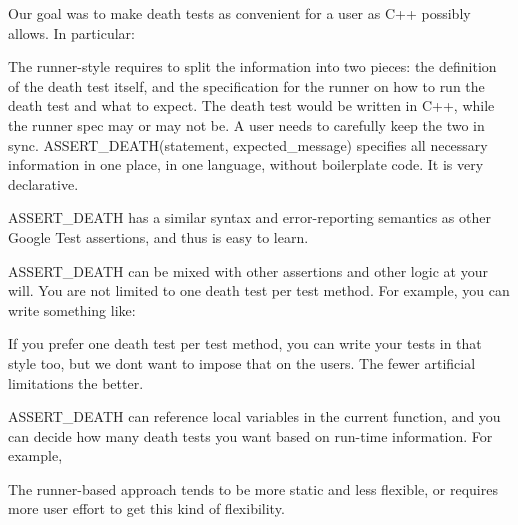 Our goal was to make death tests as convenient for a user as C++ possibly allows. In particular\+:


\begin{DoxyItemize}
\item The runner-\/style requires to split the information into two pieces\+: the definition of the death test itself, and the specification for the runner on how to run the death test and what to expect. The death test would be written in C++, while the runner spec may or may not be. A user needs to carefully keep the two in sync. {\ttfamily A\+S\+S\+E\+R\+T\+\_\+\+D\+E\+A\+T\+H(statement, expected\+\_\+message)} specifies all necessary information in one place, in one language, without boilerplate code. It is very declarative.
\item {\ttfamily A\+S\+S\+E\+R\+T\+\_\+\+D\+E\+A\+TH} has a similar syntax and error-\/reporting semantics as other Google Test assertions, and thus is easy to learn.
\item {\ttfamily A\+S\+S\+E\+R\+T\+\_\+\+D\+E\+A\+TH} can be mixed with other assertions and other logic at your will. You are not limited to one death test per test method. For example, you can write something like\+: 
\begin{DoxyCode}{0}
\DoxyCodeLine{   \}}
\end{DoxyCode}
 If you prefer one death test per test method, you can write your tests in that style too, but we don\textquotesingle{}t want to impose that on the users. The fewer artificial limitations the better.
\item {\ttfamily A\+S\+S\+E\+R\+T\+\_\+\+D\+E\+A\+TH} can reference local variables in the current function, and you can decide how many death tests you want based on run-\/time information. For example, 
\begin{DoxyCode}{0}
\DoxyCodeLine{   \}}
\end{DoxyCode}
 The runner-\/based approach tends to be more static and less flexible, or requires more user effort to get this kind of flexibility.
\end{DoxyItemize}

